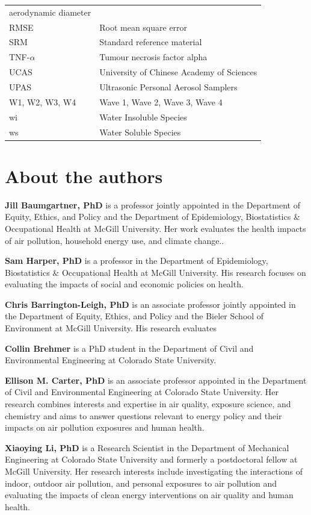 \documentclass[
  letterpaper,
  DIV=11,
  numbers=noendperiod]{scrartcl}
\begin{document}
\begin{longtable}[]{@{}
  >{\raggedright\arraybackslash}p{}
  >{\raggedright\arraybackslash}p{}@{}}
aerodynamic diameter \\
RMSE & Root mean square error \\
SRM & Standard reference material \\
TNF-\(\alpha\) & Tumour necrosis factor alpha \\
UCAS & University of Chinese Academy of Sciences \\
UPAS & Ultrasonic Personal Aerosol Samplers \\
W1, W2, W3, W4 & Wave 1, Wave 2, Wave 3, Wave 4 \\
wi & Water Insoluble Species \\
ws & Water Soluble Species \\
\end{longtable}

\section*{About the authors}\label{about-the-authors}

\textbf{Jill Baumgartner, PhD} is a professor jointly appointed in the
Department of Equity, Ethics, and Policy and the Department of
Epidemiology, Biostatistics \& Occupational Health at McGill University.
Her work evaluates the health impacts of air pollution, household energy
use, and climate change..

\textbf{Sam Harper, PhD} is a professor in the Department of
Epidemiology, Biostatistics \& Occupational Health at McGill University.
His research focuses on evaluating the impacts of social and economic
policies on health.

\textbf{Chris Barrington-Leigh, PhD} is an associate professor jointly
appointed in the Department of Equity, Ethics, and Policy and the Bieler
School of Environment at McGill University. His research evaluates

\textbf{Collin Brehmer} is a PhD student in the Department of Civil and
Environmental Engineering at Colorado State University.

\textbf{Ellison M. Carter, PhD} is an associate professor appointed in
the Department of Civil and Environmental Engineering at Colorado State
University. Her research combines interests and expertise in air
quality, exposure science, and chemistry and aims to answer questions
relevant to energy policy and their impacts on air pollution exposures
and human health.

\textbf{Xiaoying Li, PhD} is a Research Scientist in the Department of
Mechanical Engineering at Colorado State University and formerly a
postdoctoral fellow at McGill University. Her research interests include
investigating the interactions of indoor, outdoor air pollution, and
personal exposures to air pollution and evaluating the impacts of clean
energy interventions on air quality and human health.
\end{document}
